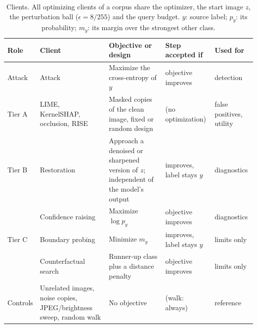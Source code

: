 \begin{table}[!tbp]
\centering\footnotesize\setlength{\tabcolsep}{4pt}
\caption{Clients. All optimizing clients of a corpus share the optimizer, the start image $z$, the perturbation ball
($\epsilon=8/255$) and the query budget. $y$: source label; $p_y$: its probability; $m_y$: its margin over the
strongest other class.}
\label{tab:clients}
\vspace{3pt}
\begin{tabular}{L{1.5cm}L{2.8cm}L{3.8cm}L{2.2cm}L{1.9cm}}
\toprule
Role & Client & Objective or design & Step accepted if & Used for \\
\midrule
Attack & Attack & Maximize the cross-entropy of $y$ & objective improves & detection \\[2pt]
Tier A & LIME, KernelSHAP, occlusion, RISE & Masked copies of the clean image, fixed or random design & (no optimization)
& false positives, utility \\[2pt]
Tier B & Restoration & Approach a denoised or sharpened version of $z$; independent of the model's output &
improves, label stays $y$ & diagnostics \\
 & Confidence raising & Maximize $\log p_y$ & objective improves & diagnostics \\[2pt]
Tier C & Boundary probing & Minimize $m_y$ & improves, label stays $y$ & limits only \\
 & Counterfactual search & Runner-up class plus a distance penalty & objective improves & limits only \\[2pt]
Controls & Unrelated images, noise copies, JPEG/brightness sweep, random walk & No objective & (walk: always) & reference \\
\bottomrule
\end{tabular}
\end{table}
